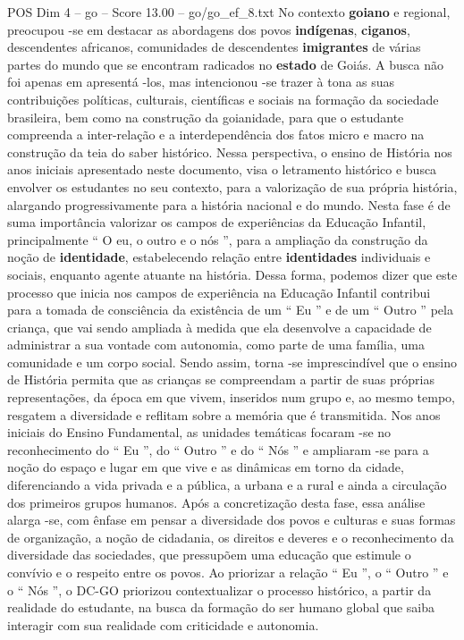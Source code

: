 \begin{textsample}{POS Dim 4 – go – Score 13.00 – go/go\_ef\_8.txt}
No contexto \textbf{goiano} e regional, preocupou -se em destacar as abordagens dos povos \textbf{indígenas}, \textbf{ciganos}, descendentes africanos, comunidades de descendentes \textbf{imigrantes} de várias partes do mundo que se encontram radicados no \textbf{estado} de Goiás.
A busca não foi apenas em apresentá -los, mas intencionou -se trazer à tona as suas contribuições políticas, culturais, científicas e sociais na formação da sociedade brasileira, bem como na construção da goianidade, para que o estudante compreenda a inter-relação e a interdependência dos fatos micro e macro na construção da teia do saber histórico.
Nessa perspectiva, o ensino de História nos anos iniciais apresentado neste documento, visa o letramento histórico e busca envolver os estudantes no seu contexto, para a valorização de sua própria história, alargando progressivamente para a história nacional e do mundo.
Nesta fase é de suma importância valorizar os campos de experiências da Educação Infantil, principalmente “ O eu, o outro e o nós ”, para a ampliação da construção da noção de \textbf{identidade}, estabelecendo relação entre \textbf{identidades} individuais e sociais, enquanto agente atuante na história.
Dessa forma, podemos dizer que este processo que inicia nos campos de experiência na Educação Infantil contribui para a tomada de consciência da existência de um “ Eu ” e de um “ Outro ” pela criança, que vai sendo ampliada à medida que ela desenvolve a capacidade de administrar a sua vontade com autonomia, como parte de uma família, uma comunidade e um corpo social.
Sendo assim, torna -se imprescindível que o ensino de História permita que as crianças se compreendam a partir de suas próprias representações, da época em que vivem, inseridos num grupo e, ao mesmo tempo, resgatem a diversidade e reflitam sobre a memória que é transmitida.
Nos anos iniciais do Ensino Fundamental, as unidades temáticas focaram -se no reconhecimento do “ Eu ”, do “ Outro ” e do “ Nós ” e ampliaram -se para a noção do espaço e lugar em que vive e as dinâmicas em torno da cidade, diferenciando a vida privada e a pública, a urbana e a rural e ainda a circulação dos primeiros grupos humanos.
Após a concretização desta fase, essa análise alarga -se, com ênfase em pensar a diversidade dos povos e culturas e suas formas de organização, a noção de cidadania, os direitos e deveres e o reconhecimento da diversidade das sociedades, que pressupõem uma educação que estimule o convívio e o respeito entre os povos.
Ao priorizar a relação “ Eu ”, o “ Outro ” e o “ Nós ”, o DC-GO priorizou contextualizar o processo histórico, a partir da realidade do estudante, na busca da formação do ser humano global que saiba interagir com sua realidade com criticidade e autonomia.

\end{textsample}

